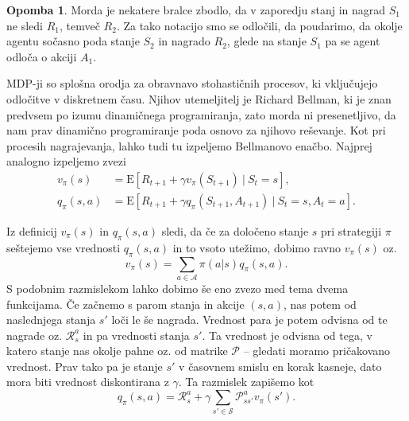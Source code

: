 \documentclass[12pt,a4paper]{amsart}
\theoremstyle{definition} %
\newtheorem{opomba}[definicija]{Opomba}
\theoremstyle{plain} %
\begin{document}
\begin{opomba}
    Morda je nekatere bralce zbodlo, da v zaporedju stanj in nagrad $S_1$ ne sledi $R_1$, temveč 
    $R_2$. Za tako notacijo smo se odločili, da poudarimo, da okolje agentu sočasno poda stanje $S_2$
    in nagrado $R_2$, glede na stanje $S_1$ pa se agent odloča o akciji $A_1$.
\end{opomba}

MDP-ji so splošna orodja za obravnavo stohastičnih procesov, ki vključujejo odločitve v diskretnem 
času. Njihov utemeljitelj je Richard Bellman, ki je znan predvsem po izumu dinamičnega 
programiranja, zato morda ni presenetljivo, da nam prav dinamično programiranje poda osnovo za 
njihovo reševanje.
Kot pri procesih nagrajevanja, lahko tudi tu izpeljemo Bellmanovo enačbo. Najprej analogno izpeljemo 
zvezi
\begin{align*}
    v_\pi(s) &= \mathrm{E} [R_{t+1} + \gamma v_\pi(S_{t+1})~|~S_t = s], \\
    q_\pi(s, a) &= \mathrm{E} [R_{t+1} + \gamma q_\pi(S_{t+1}, A_{t+1})~|~S_t = s, A_t = a].
\end{align*}

Iz definicij $v_\pi(s)$ in $q_\pi(s, a)$ sledi, da če za določeno stanje $s$ pri strategiji $\pi$ 
seštejemo vse vrednosti $q_\pi(s, a)$ in to vsoto utežimo, dobimo ravno $v_\pi(s)$ oz. 
\begin{equation}\label{zveza1}
    v_\pi(s) = \sum_{a \in \mathcal{A}} \pi(a|s)q_\pi(s, a).
\end{equation}
S podobnim razmislekom lahko dobimo še eno zvezo med tema dvema funkcijama. Če začnemo s parom stanja 
in akcije $(s, a)$, nas potem od naslednjega stanja $s'$ loči le še nagrada. Vrednost para je potem 
odvisna od te nagrade oz. $\mathcal{R}_s^a$ in pa vrednosti stanja $s'$. Ta vrednost je odvisna od tega, 
v katero stanje nas okolje pahne oz. od matrike $\mathcal{P}$ -- gledati moramo pričakovano vrednost. 
Prav tako pa je stanje $s'$ v časovnem smislu en korak kasneje, dato mora biti vrednost diskontirana z 
$\gamma$. Ta razmislek zapišemo kot
\begin{equation}\label{zveza2}
    q_\pi(s, a) = \mathcal{R}_s^a + \gamma \sum_{s' \in \mathcal{S}} \mathcal{P}_{ss'}^a v_\pi(s').
\end{equation}
\end{document}
